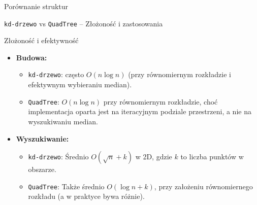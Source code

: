 \documentclass[aspectratio=1610, polish]{beamer}
\begin{document}
\begin{section}{Porównanie struktur}
\begin{frame}{\texttt{kd-drzewo} vs \texttt{QuadTree} -- Złożoność i zastosowania}
    \begin{block}{Złożoność i efektywność}
    \begin{itemize}
        \item \textbf{Budowa:}
            \begin{itemize}
                \item \texttt{kd-drzewo}: często \(O(n \log n)\) (przy równomiernym rozkładzie i efektywnym wybieraniu median).  
                \item \texttt{QuadTree}: \(O(n \log n)\) przy równomiernym rozkładzie, choć implementacja oparta jest na iteracyjnym podziale przestrzeni, a nie na wyszukiwaniu median.
            \end{itemize}
        \item \textbf{Wyszukiwanie:}
            \begin{itemize}
                \item \texttt{kd-drzewo}: Średnio \(O(\sqrt{n} + k)\) w 2D, gdzie \(k\) to liczba punktów w obszarze.
                \item \texttt{QuadTree}: Także średnio \(O(\log n + k)\), przy założeniu równomiernego rozkładu (a w praktyce bywa różnie).
            \end{itemize}
    \end{itemize}
    \end{block}
\end{frame}


\end{section}
\end{document}
